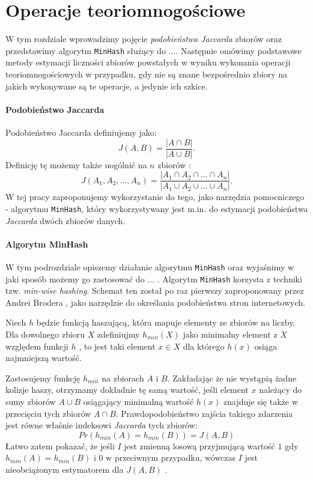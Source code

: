 \chapter{Operacje teoriomnogościowe}
\thispagestyle{chapterBeginStyle}

W tym rozdziale wprowadzimy pojęcie \textit{podobieństwa Jaccarda} zbiorów oraz przedstawimy algorytm \texttt{MinHash} służący do ....
 Następnie omówimy podstawowe metody estymacji liczności zbiorów powstałych w wyniku wykonania operacji teoriomnogościowych w przypadku, gdy nie są znane bezpośrednio zbiory na jakich wykonywane są te operacje, a jedynie ich szkice. 

\subsubsection{Podobieństwo Jaccarda}
Podobieństwo Jaccarda definiujemy jako:
\begin{equation}
    J(A, B) = \frac{|A \cap B|}{|A \cup B|}.
\end{equation}
Definicję tę możemy także uogólnić  na $n$ zbiorów \cite{adroll}:
\begin{equation}
    J(A_1, A_2, ..., A_n) = \frac{|A_1 \cap A_2 \cap ... \cap A_n|}{|A_1 \cup A_2 \cup ... \cup A_n|}.
\end{equation}
 W tej pracy zaproponujemy wykorzystanie do tego, jako narzędzia pomocniczego - algorytmu \texttt{MinHash}, który wykorzystywany jest m.in. do estymacji podobieństwa \textit{Jaccarda} dwóch zbiorów danych.

\subsubsection{Algorytm MinHash}
W tym podrozdziale opiszemy działanie algorytmu \texttt{MinHash} oraz wyjaśnimy w jaki sposób możemy go zastosować do ... .
Algorytm \texttt{MinHash} korzysta z techniki tzw. \textit{min-wise hashing}. Schemat ten został po raz pierwszy zaproponowany przez Andrei Brodera \cite{broder}, jako narzędzie do określania podobieństwa stron internetowych.

Niech $h$ będzie funkcją haszującą, która mapuje elementy ze zbiorów na liczby.
 Dla dowolnego zbioru $X$ zdefiniujmy $h_{min}(X)$ jako minimalny element z $X$ względem funkcji $h$ , to jest taki element $x \in X$ dla którego $h(x)$ osiąga najmniejszą wartość.

Zastosujemy funkcję $h_{min}$ na zbiorach $A$ i $B$. Zakładając że nie wystąpią żadne kolizje haszy, otrzymamy dokładnie tę samą wartość, jeśli element $x$ należący do sumy zbiorów $A \cup B$ osiągający minimalną wartość $h(x)$ znajduje się także w przecięciu tych zbiorów $A \cap B$. Prawdopodobieństwo zajścia takiego zdarzenia jest równe właśnie indeksowi \textit{Jaccarda} tych zbiorów:
\begin{equation}
    Pr(h_{min}(A) = h_{min}(B)) = J(A, B)
\end{equation}
Łatwo zatem pokazać, że jeśli $I$ jest zmienną losową przyjmującą wartość $1$ gdy $h_{min}(A) = h_{min}(B)$ i $0$ w przeciwnym przypadku, wówczas $I$ jest nieobciążonym estymatorem dla $J(A, B)$ \cite{minhash}.

